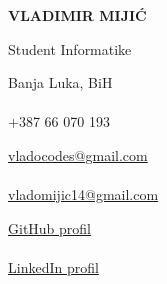 \documentclass[9pt]{developercv} %
\begin{document}

\begin{minipage}[t]{0.45\textwidth}
	\vspace{-\baselineskip}
	
	{\Huge\textbf{\MakeUppercase{Vladimir Mijić}}}
	
	\vspace{6pt}
	
	{\huge Student Informatike}
\end{minipage}

\vspace{1cm}

\begin{minipage}[t]{0.3\textwidth}
    \vspace{-\baselineskip}
    
	{\faMapMarker \space}{Banja Luka, BiH}\\\\
	{\faPhone \space}{+387 66 070 193}\\
\end{minipage}
\hfill
\begin{minipage}[t]{0.3\textwidth}
	\vspace{-\baselineskip}
	
	{\faEnvelopeO \space}{\href{mailto:vladocodes@gmail.com}{vladocodes@gmail.com}}\\\\
	{\faEnvelopeO \space}{\href{mailto:vladomijic14@gmail.com}{vladomijic14@gmail.com}}\\
\end{minipage}
\hfill
\begin{minipage}[t]{0.3\textwidth}
	\vspace{-\baselineskip}
	
    {\faGithub \space}{\href{https://github.com/vladocodes}{GitHub profil}}\\\\
    {\faLinkedin \space}{\href{https://www.linkedin.com/in/vladimir-mijic}{LinkedIn profil}}\\
\end{minipage}

\vspace{.5cm}



\end{document}
